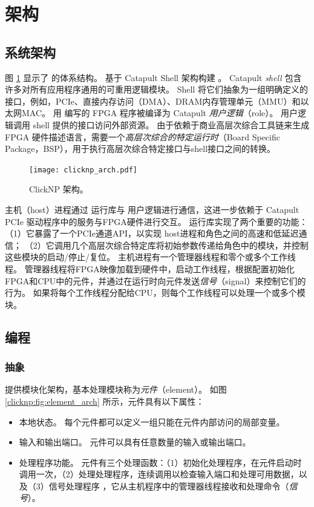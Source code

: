 \section{架构}
\label{clicknp:sec:architecture}

\subsection{系统架构}
\label{clicknp:subsec:sysarch}

图 \ref{clicknp:fig:clicknp} 显示了 \name 的体系结构。
\name 基于 Catapult Shell 架构构建 \cite {putnam2014reconfigurable}。
Catapult \textit {shell} 包含许多对所有应用程序通用的可重用逻辑模块。
Shell 将它们抽象为一组明确定义的接口，例如，PCIe、直接内存访问（DMA）、DRAM内存管理单元（MMU）和以太网MAC。
用 \name 编写的 FPGA 程序被编译为 Catapult \textit {用户逻辑}（role）。
用户逻辑调用 shell 提供的接口访问外部资源。
由于\name 依赖于商业高层次综合工具链来生成 FPGA 硬件描述语言，需要一个\textit {高层次综合的特定运行时}（Board Specific Package，BSP），用于执行高层次综合特定接口与shell接口之间的转换。


\begin{figure}
	\centering
	\texttt{[image: clicknp\_arch.pdf]}
	\caption{ClickNP 架构。}
	\label{clicknp:fig:clicknp}
\end{figure}


\name{} 主机（host）进程通过 \name{} 运行库与 \name{} 用户逻辑进行通信，这进一步依赖于 Catapult PCIe 驱动程序中的服务与FPGA硬件进行交互。
\name{} 运行库实现了两个重要的功能：
（1）它暴露了一个PCIe通道API，以实现 \name{} host进程和角色之间的高速和低延迟通信；
（2）它调用几个高层次综合特定库将初始参数传递给角色中的模块，并控制这些模块的启动/停止/复位。
\name{} 主机进程有一个管理器线程和零个或多个工作线程。
管理器线程将FPGA映像加载到硬件中，启动工作线程，根据配置初始化FPGA和CPU中的\name 元件，并通过在运行时向元件发送\textit {信号}（signal）来控制它们的行为。
如果将每个工作线程分配给CPU，则每个工作线程可以处理一个或多个模块。

\subsection{\name 编程}

\subsubsection{抽象}

\name 提供模块化架构，基本处理模块称为\textit{元件}（element）。
如图 \ref{clicknp:fig:element_arch} 所示，\name 元件具有以下属性：
\begin{itemize}
\item 本地状态。 每个元件都可以定义一组只能在元件内部访问的局部变量。
\item 输入和输出端口。 元件可以具有任意数量的输入或输出端口。
\item 处理程序功能。 元件有三个处理函数：（1）初始化处理程序，在元件启动时调用一次，（2）处理处理程序，连续调用以检查输入端口和处理可用数据，以及（3）信号处理程序 ，它从主机程序中的管理器线程接收和处理命令（\textit {信号}）。
\end{itemize}

